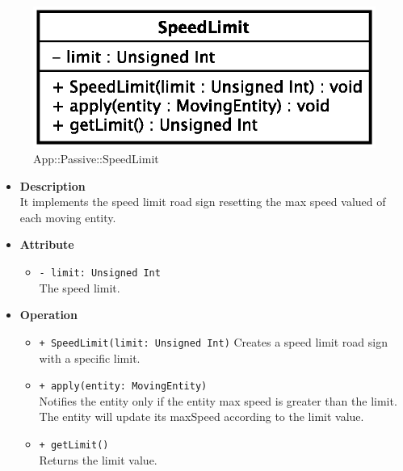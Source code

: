 \begin{figure}[h]
\centering
\includegraphics[scale=0.6,keepaspectratio]{images/solution/speed_limit.eps}
\caption{App::Passive::SpeedLimit}
\label{fig:sd-app-speed_limit}
\end{figure}
\FloatBarrier
\begin{itemize}
  \item \textbf{Description} \\
It implements the speed limit road sign resetting the max speed valued of each moving entity.
  \item \textbf{Attribute}
  \begin{itemize}
    \item \texttt{- limit: Unsigned Int} \\
The speed limit.
  \end{itemize}
  \item \textbf{Operation}
  \begin{itemize} 
  \item \texttt{+ SpeedLimit(limit: Unsigned Int)}
Creates a speed limit road sign with a specific limit.    
  \item \texttt{+ apply(entity: MovingEntity)} \\
Notifies the entity only if the entity max speed is greater than the limit.
The entity will update its maxSpeed according to the limit value.
  \item \texttt{+ getLimit()} \\
Returns the limit value.
  \end{itemize}
\end{itemize}
